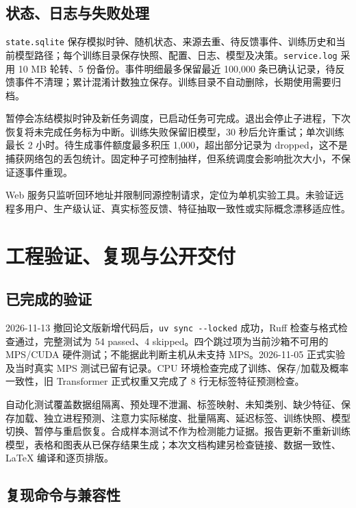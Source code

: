 \documentclass[UTF8,a4paper,11pt,fontset=fandol]{ctexart}
\begin{document}
\subsection{状态、日志与失败处理}\label{ux72b6ux6001ux65e5ux5fd7ux4e0eux5931ux8d25ux5904ux7406}

\texttt{state.sqlite}
保存模拟时钟、随机状态、来源去重、待反馈事件、训练历史和当前模型路径；每个训练目录保存快照、配置、日志、模型及决策。\texttt{service.log}
采用 10 MB 轮转、5 份备份。事件明细最多保留最近 100,000
条已确认记录，待反馈事件不清理；累计混淆计数独立保存。训练目录不自动删除，长期使用需要归档。

暂停会冻结模拟时钟及新任务调度，已启动任务可完成。退出会停止子进程，下次恢复将未完成任务标为中断。训练失败保留旧模型，30
秒后允许重试；单次训练最长 2 小时。待生成事件额度最多积压
1,000，超出部分记录为
dropped，这不是捕获网络包的丢包统计。固定种子可控制抽样，但系统调度会影响批次大小，不保证逐事件重现。

Web
服务只监听回环地址并限制同源控制请求，定位为单机实验工具。未验证远程多用户、生产级认证、真实标签反馈、特征抽取一致性或实际概念漂移适应性。

\section{工程验证、复现与公开交付}\label{ux5de5ux7a0bux9a8cux8bc1ux590dux73b0ux4e0eux516cux5f00ux4ea4ux4ed8}

\subsection{已完成的验证}\label{ux5df2ux5b8cux6210ux7684ux9a8cux8bc1}

2026-11-13 撤回论文版新增代码后，\texttt{uv\ sync\ -\/-locked}
成功，Ruff 检查与格式检查通过，完整测试为 54 passed、4
skipped。四个跳过项为当前沙箱不可用的 MPS/CUDA
硬件测试；不能据此判断主机从未支持 MPS。2026-11-05 正式实验及当时真实
MPS 测试已留有记录。CPU 环境检查完成了训练、保存/加载及概率一致性，旧
Transformer 正式权重又完成了 8 行无标签特征预测检查。

自动化测试覆盖数据组隔离、预处理不泄漏、标签映射、未知类别、缺少特征、保存加载、独立进程预测、注意力实际梯度、批量隔离、延迟标签、训练快照、模型切换、暂停与重启恢复。合成样本测试不作为检测能力证据。报告更新不重新训练模型，表格和图表从已保存结果生成；本次文档构建另检查链接、数据一致性、LaTeX
编译和逐页排版。

\subsection{复现命令与兼容性}\label{ux590dux73b0ux547dux4ee4ux4e0eux517cux5bb9ux6027}
\end{document}
